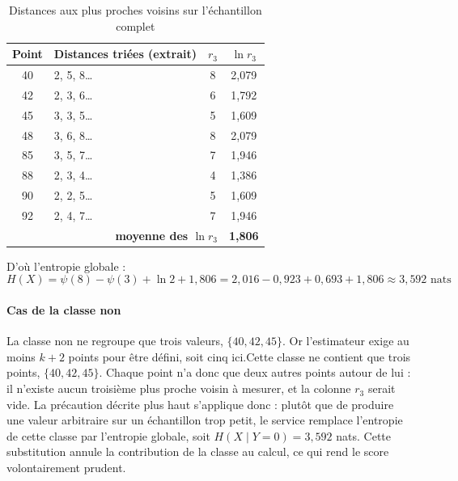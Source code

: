 \begin{table}[H]
    \centering
    \label{tab:mi-rk-global}
    \begin{tabular}{|c|l|c|c|}
        \hline
        \textbf{Point} & \textbf{Distances triées (extrait)} & $r_3$ & $\ln r_3$ \\
        \hline
        40 & 2, 5, 8\ldots & 8 & 2,079 \\
        \hline
        42 & 2, 3, 6\ldots & 6 & 1,792 \\
        \hline
        45 & 3, 3, 5\ldots & 5 & 1,609 \\
        \hline
        48 & 3, 6, 8\ldots & 8 & 2,079 \\
        \hline
        85 & 3, 5, 7\ldots & 7 & 1,946 \\
        \hline
        88 & 2, 3, 4\ldots & 4 & 1,386 \\
        \hline
        90 & 2, 2, 5\ldots & 5 & 1,609 \\
        \hline
        92 & 2, 4, 7\ldots & 7 & 1,946 \\
        \hline
        \multicolumn{3}{|r|}{\textbf{moyenne des $\ln r_3$}} & \textbf{1,806} \\
        \hline
    \end{tabular}
    \caption{Distances aux plus proches voisins sur l'échantillon complet}

\end{table}

D'où l'entropie globale :
\[
H(X) = \psi(8) - \psi(3) + \ln 2 + 1{,}806 = 2{,}016 - 0{,}923 + 0{,}693 + 1{,}806 \approx 3{,}592 \text{ nats}
\]

\paragraph{Cas de la classe \og non \fg}

La classe \og non \fg{} ne regroupe que trois valeurs, $\{40, 42, 45\}$. Or l'estimateur exige au moins $k+2$ points pour être défini, soit cinq ici.Cette classe ne contient que trois points, $\{40, 42, 45\}$. Chaque point n'a donc que deux autres points autour de lui : il n'existe aucun troisième plus proche voisin à mesurer, et la colonne $r_3$ serait vide. La précaution décrite plus haut s'applique donc : plutôt que de produire une valeur arbitraire sur un échantillon trop petit, le service remplace l'entropie de cette classe par l'entropie globale, soit $H(X \mid Y{=}0) = 3{,}592$ nats. Cette substitution annule la contribution de la classe au calcul, ce qui rend le score volontairement prudent.

